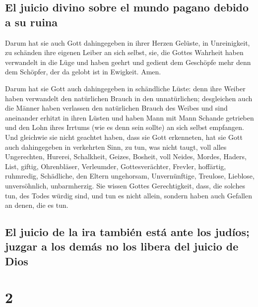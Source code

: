 \hypertarget{el-juicio-divino-sobre-el-mundo-pagano-debido-a-su-ruina}{%
\subsection{El juicio divino sobre el mundo pagano debido a su
ruina}\label{el-juicio-divino-sobre-el-mundo-pagano-debido-a-su-ruina}}

 Darum hat sie auch Gott dahingegeben in ihrer Herzen
Gelüste, in Unreinigkeit, zu schänden ihre eigenen Leiber an sich
selbst,  sie, die Gottes Wahrheit haben verwandelt in die
Lüge und haben geehrt und gedient dem Geschöpfe mehr denn dem Schöpfer,
der da gelobt ist in Ewigkeit. Amen.

 Darum hat sie Gott auch dahingegeben in schändliche
Lüste: denn ihre Weiber haben verwandelt den natürlichen Brauch in den
unnatürlichen;  desgleichen auch die Männer haben
verlassen den natürlichen Brauch des Weibes und sind aneinander erhitzt
in ihren Lüsten und haben Mann mit Mann Schande getrieben und den Lohn
ihres Irrtums (wie es denn sein sollte) an sich selbst empfangen.
 Und gleichwie sie nicht geachtet haben, dass sie Gott
erkenneten, hat sie Gott auch dahingegeben in verkehrten Sinn, zu tun,
was nicht taugt,  voll alles Ungerechten, Hurerei,
Schalkheit, Geizes, Bosheit, voll Neides, Mordes, Haders, List, giftig,
Ohrenbläser,  Verleumder, Gottesverächter, Frevler,
hoffärtig, ruhmredig, Schädliche, den Eltern ungehorsam, 
Unvernünftige, Treulose, Lieblose, unversöhnlich, unbarmherzig.
 Sie wissen Gottes Gerechtigkeit, dass, die solches tun,
des Todes würdig sind, und tun es nicht allein, sondern haben auch
Gefallen an denen, die es tun.

\hypertarget{el-juicio-de-la-ira-tambiuxe9n-estuxe1-ante-los-juduxedos-juzgar-a-los-demuxe1s-no-los-libera-del-juicio-de-dios}{%
\subsection{El juicio de la ira también está ante los judíos; juzgar a
los demás no los libera del juicio de
Dios}\label{el-juicio-de-la-ira-tambiuxe9n-estuxe1-ante-los-juduxedos-juzgar-a-los-demuxe1s-no-los-libera-del-juicio-de-dios}}

\hypertarget{section-1}{%
\section{2}\label{section-1}}

